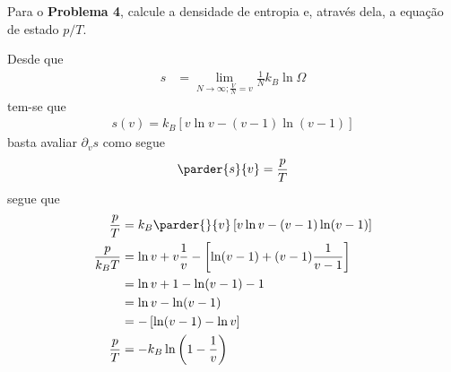 \begin{prob}
	Para o \textbf{Problema 4}, calcule a densidade de entropia e, através dela, a equação de estado $p/T$.
	\begin{sol}
		
	\end{sol}Desde que
	\begin{align}
		s&=\displaystyle \lim_{N \to \infty;\frac{V}{N}=v}\frac{1}{N}k_B\ln\Omega
	\end{align}
	tem-se que
	\begin{align}
		s(v)=k_B\left[v\ln v-(v-1)\ln(v-1)\right]
	\end{align}
	basta avaliar $\partial_vs$ como segue
	\begin{align}
		\parder{s}{v}=\frac{p}{T}
	\end{align}
	segue que 
	\begin{align}
		\begin{split}
			\frac{p}{T}&=k_B\parder{}{v}\left[v\ln v-(v-1)\ln(v-1)\right]\\
			\frac{p}{k_BT}&=\ln v+v\frac{1}{v}-\left[\ln(v-1)+(v-1)\frac{1}{v-1}\right]\\
			&=\ln v+1-\ln(v-1)-1\\
			&=\ln v-\ln (v-1)\\
			&=-\left[\ln(v-1)-\ln v\right]\\
			\frac{p}{T}&=-k_B\ln\left(1-\frac{1}{v}\right)
		\end{split}
	\end{align}
\end{prob}


